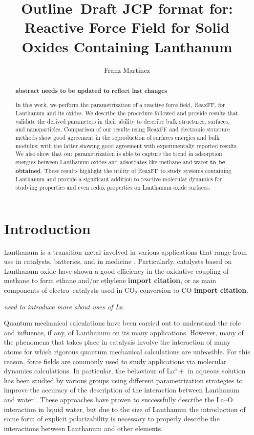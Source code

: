 \documentclass[journal=jpcafh,manuscript=article]{achemso}
\author{Franz Martinez}
\affiliation{Schulich School of Engineering, University of Calgary, Calgary, Alberta, Canada}
\title{Outline--Draft JCP format for: Reactive Force Field for Solid Oxides Containing Lanthanum}
\begin{document}
\begin{abstract}
\textbf{abstract needs to be updated to reflect last changes}


In this work, we perform the parametrization of a reactive force field, ReaxFF, for Lanthanum and its oxides.
We describe the procedure followed and provide results that validate the derived parameters in their ability to describe bulk structures, surfaces, and nanoparticles.
Comparison of our results using ReaxFF and electronic structure methods show good agreement in the reproduction of surfaces energies and bulk modulus; with the latter showing good agreement with experimentally reported results.
We also show that our parametrization is able to capture the trend in adsorption energies between Lanthanum oxides and adsorbates like methane and water \textbf{to be obtained}.
These results highlight the utility of ReaxFF to study systems containing Lanthanum and provide a significant addition to reactive molecular dynamics for studying properties and even redox properties on Lanthanum oxide surfaces.

\end{abstract}


\section{Introduction}

Lanthanum is a transition metal involved in various applications that range from use in catalysts, batteries, and in medicine \cite{atwood2013rare,he2013preparation}.
Particularly, catalysts based on Lanthanum oxide have shown a good efficiency in the oxidative coupling of methane to form ethane and/or ethylene \textbf{import citation}, or as main components of electro--catalysts used in CO$_2$ conversion to CO \textbf{import citation}.

\emph{need to introduce more about uses of La}

Quantum mechanical calculations have been carried out to understand the role and influence, if any, of Lanthanum on its many applications.
However, many of the phenomena that takes place in catalysis involve the interaction of many atoms for which rigorous quantum mechanical calculations are unfeasible.
For this reason, force fields are commonly used to study applications via molecular dynamics calculations.
In particular, the behaviour of La$^3+$ in aqueous solution has been studied by various groups using different parametrization strategies to improve the accuracy of the description of the interaction between Lanthanum and water \cite{duvail2007pair}.
These approaches have proven to successfully describe the La--O interaction in liquid water, but due to the size of Lanthanum the introduction of some form of explicit polarizability is necessary to properly describe the interactions between Lanthanum and other elements.
\end{document}
